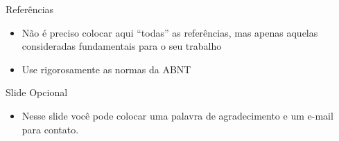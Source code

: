 \documentclass{beamer}
\begin{document}
\begin{frame}{Referências}
    \begin{itemize}
        \item Não é preciso  colocar aqui “todas” as referências, mas apenas aquelas consideradas fundamentais para o seu trabalho
        \item Use rigorosamente as normas da ABNT
    \end{itemize}
\end{frame}

\begin{frame}{Slide Opcional}
    \begin{itemize}
        \item Nesse slide você pode colocar uma palavra de agradecimento e um e-mail para contato.
    \end{itemize}
\end{frame}
\end{document}
